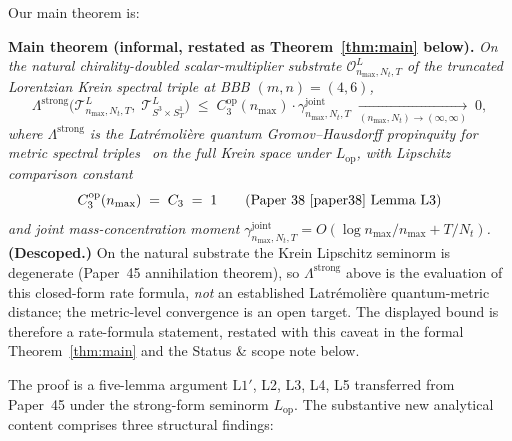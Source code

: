 \documentclass[11pt,a4paper]{article}
\theoremstyle{plain}
\theoremstyle{definition}
\newcommand{\nmax}{n_{\max}}
\newcommand{\Nt}{N_{t}}
\newcommand{\Manifold}{S^{3}\times S^{1}_{T}}
\newcommand{\Op}{\mathcal{O}}
\newcommand{\Tcal}{\mathcal{T}}
\newcommand{\Lprop}{\Lambda^{\mathrm{strong}}}
\newcommand{\Lop}{L_{\mathrm{op}}}
\newcommand{\gammajoint}{\gamma^{\mathrm{joint}}}
\newcommand{\Cthreeop}{C_{3}^{\mathrm{op}}}
\begin{document}
Our main theorem is:

\medskip\noindent
\textbf{Main theorem (informal, restated as Theorem~\ref{thm:main} below).}
\emph{On the natural chirality-doubled scalar-multiplier substrate
$\Op^{L}_{\nmax, \Nt, T}$ of the truncated Lorentzian Krein
spectral triple at BBB $(m, n) = (4, 6)$,}
\begin{equation*}
   \Lprop\!\bigl(\Tcal^{L}_{\nmax,\Nt,T},\;
                 \Tcal^{L}_{\Manifold}\bigr)
   \;\le\; \Cthreeop(\nmax) \cdot \gammajoint_{\nmax, \Nt, T}
   \;\xrightarrow[(\nmax, \Nt)\to(\infty,\infty)]{}\; 0,
\end{equation*}
\emph{where $\Lprop$ is the Latr\'emoli\`ere quantum Gromov--Hausdorff
propinquity for metric spectral triples~\cite{latremoliere_metric_st_2017}
on the full Krein space under $\Lop$, with Lipschitz comparison constant}
\begin{equation*}
   \Cthreeop(\nmax) \;=\; C_{3} \;=\; 1
   \qquad \text{(Paper~38~\cite{paper38} Lemma~L3)}
\end{equation*}
\emph{and joint mass-concentration moment
$\gammajoint_{\nmax, \Nt, T} = O(\log\nmax/\nmax + T/\Nt)$.}
\textbf{(Descoped.)} On the natural substrate the Krein Lipschitz
seminorm is degenerate (Paper~45 annihilation theorem), so $\Lprop$
above is the evaluation of this closed-form rate formula, \emph{not} an
established Latr\'emoli\`ere quantum-metric distance; the metric-level
convergence is an open target. The displayed bound is therefore a
rate-formula statement, restated with this caveat in the formal
Theorem~\ref{thm:main} and the Status \& scope note below.
\medskip

The proof is a five-lemma argument $\mathrm{L1}'$, L2, L3, L4, L5
transferred from Paper~45 under the strong-form seminorm $\Lop$. The
substantive new analytical content comprises three structural findings:
\end{document}
